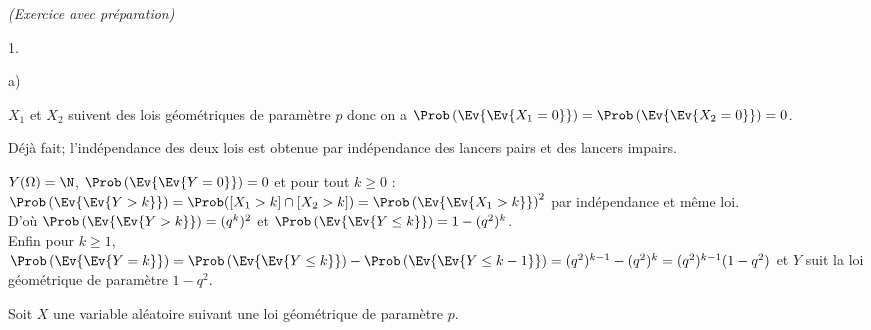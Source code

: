 \documentclass[11pt]{article}%
\begin{document}
\begin{exercice}{\it (Exercice avec préparation)}
\begin{noliste}{1.}
 \item 
 \begin{noliste}{a)}
 \setlength{\itemsep}{2mm} 
 \item $X_{1}$ et $X_{2}$ suivent des lois géométriques de paramètre
$p$ donc on a $\Prob\left(\Ev{\Ev{X_{1} = 0}}\right) =
\Prob\left(\Ev{\Ev{ X_{2} = 0}}\right) = 0$. \\
 \item Déjà fait; l'indépendance des deux lois est obtenue par
indépendance des lancers pairs et des lancers impairs. \\
 \item $Y(\Omega) = \N$, $\Prob\left(\Ev{\Ev{ Y = 0}}\right) = 0$ et
pour tout $k \geq 0$ : \\
 $\Prob\left(\Ev{\Ev{ Y > k}}\right) = \Prob( [X_{1} > k] \cap [X_{2} >
k] ) = \Prob\left(\Ev{\Ev{ X_{1} > k}}\right)^{2}$ par indépendance et
même loi. \\
 D'où $\Prob\left(\Ev{\Ev{Y > k}}\right) = ( q^{k})^{2}$ et
$\Prob\left(\Ev{\Ev{ Y \leq k}}\right) = 1 - (q^{2})^{k}$. \\
 Enfin pour $k \geq 1$, $\Prob\left(\Ev{\Ev{Y = k}}\right) =
\Prob\left(\Ev{\Ev{ Y \leq k}}\right) - \Prob\left(\Ev{\Ev{ Y \leq
k-1}}\right) = (q^{2})^{k-1} - (q^{2})^{k} = (q^{2})^{k-1} ( 1 -
q^{2})$ et $Y$ suit la loi géométrique de paramètre $1 - q^{2}$. \\
 \end{noliste}
 \item Soit $X$ une variable aléatoire suivant une loi géométrique de
paramètre $p$. 
\end{noliste}
\end{exercice}
\end{document}

